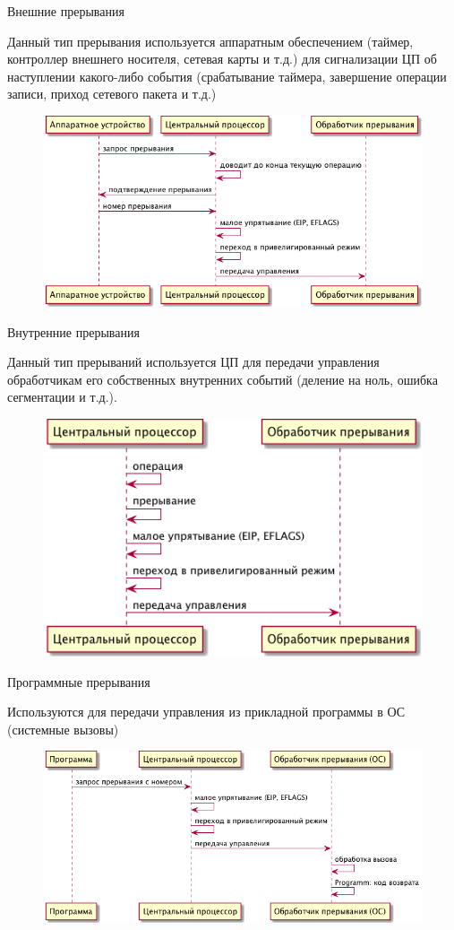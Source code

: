 \documentclass[utf8, russian, aspectratio=1610]{beamer}
\begin{document}
\begin{frame}{Внешние прерывания}

    Данный тип прерывания используется аппаратным обеспечением
    (таймер, контроллер внешнего носителя, сетевая карты и т.д.)
    для сигнализации ЦП об наступлении какого-либо события (срабатывание таймера,
    завершение операции записи, приход сетевого пакета и т.д.)
    \begin{figure}
        \centering
        \includegraphics[width=0.8\linewidth]{fig/hardware-interrupt.png}
    \end{figure}
\end{frame}

\begin{frame}{Внутренние прерывания}

    Данный тип прерываний используется ЦП для передачи управления обработчикам его
    собственных внутренних событий (деление на ноль, ошибка сегментации и т.д.).
    \begin{figure}
        \centering
        \includegraphics[width=0.6\linewidth]{fig/traps.png}
    \end{figure}
\end{frame}

\begin{frame}{Программные прерывания}

    Используются для передачи управления из прикладной программы в ОС (системные вызовы)
    \begin{figure}
        \centering
        \includegraphics[width=0.8\linewidth]{fig/syscalls.png}
    \end{figure}
\end{frame}
\end{document}
